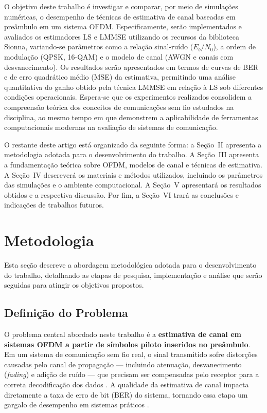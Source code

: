 \documentclass[conference]{IEEEtran}
\begin{document}
O objetivo deste trabalho é investigar e comparar, por meio de simulações numéricas, o desempenho de técnicas de estimativa de canal baseadas em preâmbulo em um sistema OFDM. Especificamente, serão implementados e avaliados os estimadores LS e LMMSE utilizando os recursos da biblioteca Sionna, variando-se parâmetros como a relação sinal-ruído ($E_b/N_0$), a ordem de modulação (QPSK, 16-QAM) e o modelo de canal (AWGN e canais com desvanecimento). Os resultados serão apresentados em termos de curvas de BER e de erro quadrático médio (MSE) da estimativa, permitindo uma análise quantitativa do ganho obtido pela técnica LMMSE em relação à LS sob diferentes condições operacionais. Espera-se que os experimentos realizados consolidem a compreensão teórica dos conceitos de comunicações sem fio estudados na disciplina, ao mesmo tempo em que demonstrem a aplicabilidade de ferramentas computacionais modernas na avaliação de sistemas de comunicação.

O restante deste artigo está organizado da seguinte forma: a Seção~II apresenta a metodologia adotada para o desenvolvimento do trabalho. A Seção~III apresenta a fundamentação teórica sobre OFDM, modelos de canal e técnicas de estimativa. A Seção~IV descreverá os materiais e métodos utilizados, incluindo os parâmetros das simulações e o ambiente computacional. A Seção~V apresentará os resultados obtidos e a respectiva discussão. Por fim, a Seção~VI trará as conclusões e indicações de trabalhos futuros.

\section{Metodologia}

Esta seção descreve a abordagem metodológica adotada para o desenvolvimento do trabalho, detalhando as etapas de pesquisa, implementação e análise que serão seguidas para atingir os objetivos propostos.

\subsection{Definição do Problema}

O problema central abordado neste trabalho é a \textbf{estimativa de canal em sistemas OFDM a partir de símbolos piloto inseridos no preâmbulo}. Em um sistema de comunicação sem fio real, o sinal transmitido sofre distorções causadas pelo canal de propagação --- incluindo atenuação, desvanecimento (\textit{fading}) e adição de ruído --- que precisam ser compensadas pelo receptor para a correta decodificação dos dados \cite{proakis2008, goldsmith2005}. A qualidade da estimativa de canal impacta diretamente a taxa de erro de bit (BER) do sistema, tornando essa etapa um gargalo de desempenho em sistemas práticos \cite{vanDeBeek1995}.
\end{document}
